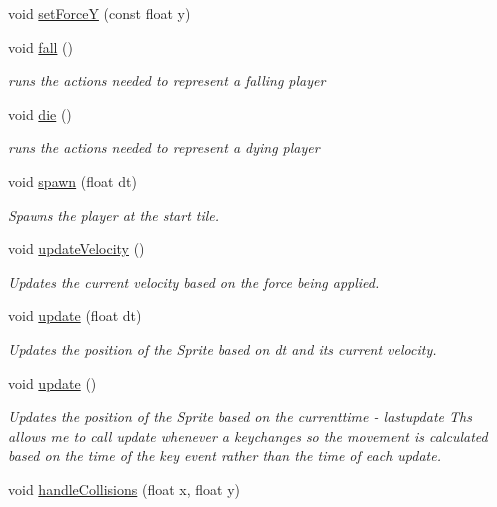 \begin{DoxyCompactItemize}
void \hyperlink{class_b_player_a94916a0f75042c2e6265fa7c9ec4db32}{set\-Force\-Y} (const float y)
\item 
void \hyperlink{class_b_player_a7981065d2d5b4c581d84cb5b63a15d00}{fall} ()
\begin{DoxyCompactList}\small\item\em runs the actions needed to represent a falling player \end{DoxyCompactList}\item 
void \hyperlink{class_b_player_a5a46736f890786b465bfe51c9c4f8ff7}{die} ()
\begin{DoxyCompactList}\small\item\em runs the actions needed to represent a dying player \end{DoxyCompactList}\item 
void \hyperlink{class_b_player_a1f66cceac56c4252237f6e30003efa4d}{spawn} (float dt)
\begin{DoxyCompactList}\small\item\em \-Spawns the player at the start tile. \end{DoxyCompactList}\item 
void \hyperlink{class_b_player_aa0f9b22686ad0aeec30ea21beb3740f2}{update\-Velocity} ()
\begin{DoxyCompactList}\small\item\em \-Updates the current velocity based on the force being applied. \end{DoxyCompactList}\item 
void \hyperlink{class_b_player_a86f9b0c0d7b4c61ed475f0e70249be7f}{update} (float dt)
\begin{DoxyCompactList}\small\item\em \-Updates the position of the \-Sprite based on dt and its current velocity. \end{DoxyCompactList}\item 
void \hyperlink{class_b_player_a709a36eb859dd8f9a4355e036eac8ac8}{update} ()
\begin{DoxyCompactList}\small\item\em \-Updates the position of the \-Sprite based on the currenttime -\/ lastupdate \-Ths allows me to call update whenever a keychanges so the movement is calculated based on the time of the key event rather than the time of each update. \end{DoxyCompactList}\item 
void \hyperlink{class_b_player_a4c0f72ebb2a0b95eb35fab6598924992}{handle\-Collisions} (float x, float y)

\end{DoxyCompactItemize}
